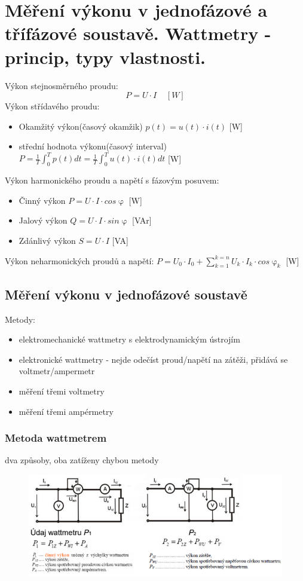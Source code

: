  \section{Měření výkonu v jednofázové a třífázové soustavě. Wattmetry - princip, typy vlastnosti.}
 Výkon stejnosměrného proudu:
 \begin{equation}
    P = U\cdot I \;\;\;\; [W]
 \end{equation}
 Výkon střídavého proudu:
 \begin{itemize}
    \item Okamžitý výkon(časový okamžik) $p(t) = u(t)\cdot i(t)$   [W]
    \item střední hodnota výkonu(časový interval) $P = \frac{1}{T}\int_0^Tp(t)dt = \frac{1}{T}\int_0^Tu(t)\cdot i(t)dt$    [W]
 \end{itemize}

 Výkon harmonického proudu a napětí s fázovým posuvem:
 \begin{itemize}
    \item Činný výkon    $P = U\cdot I \cdot cos \upvarphi $    [W]
    \item Jalový výkon   $Q = U\cdot I \cdot sin \upvarphi $    [VAr]
    \item Zdánlivý výkon  $S = U \cdot I$                     [VA]
 \end{itemize}
 Výkon neharmonických proudů a napětí: $P = U_0\cdot I_0 + \sum^{k=n}_{k=1}U_k\cdot I_k \cdot cos \upvarphi_k$     [W]
\subsection*{Měření výkonu v jednofázové soustavě}
Metody:
\begin{itemize}
    \item elektromechanické wattmetry s elektrodynamickým ústrojím
    \item elektronické wattmetry - nejde odečíst proud/napětí na zátěži, přidává se voltmetr/ampermetr
    \item měření třemi voltmetry
    \item měření třemi ampérmetry
\end{itemize}

\subsubsection*{Metoda wattmetrem}
dva způsoby, oba zatíženy chybou metody
\begin{figure}[H]
    \includegraphics*[scale = 1]{images/wattmetry2.png}
\end{figure}
\newpage

